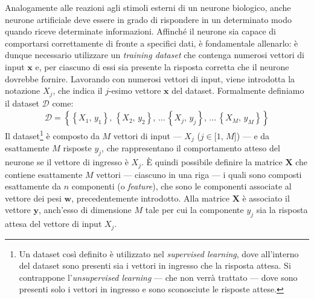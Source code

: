 Analogamente alle reazioni agli stimoli esterni di un neurone biologico, anche neurone artificiale deve essere in grado di rispondere in un determinato modo quando riceve determinate informazioni. Affinché il neurone sia capace di comportarsi correttamente di fronte a specifici dati, è fondamentale allenarlo: è dunque necessario utilizzare un \textit{training dataset} che contenga numerosi vettori di input $\mathbf{x}$ e, per ciascuno di essi sia presente la risposta corretta che il neurone dovrebbe fornire. Lavorando con numerosi vettori di input, viene introdotta la notazione $X_j$, che indica il $j$-esimo vettore $\mathbf{x}$ del dataset. Formalmente definiamo il dataset $\mathcal{D}$ come:
% 
\begin{gather*}
    \mathcal{D} = \left\{ \left\{ X_1,\, y_1 \right\},\,\left\{ X_2,\, y_2 \right\},\,\dots\,\left\{ X_j,\, y_j \right\},\,\dots\,\left\{ X_M,\, y_M \right\} \right\}  
\end{gather*}
% 
\noindent Il dataset\footnote{Un dataset così definito è utilizzato nel \textit{supervised learning}, dove all'interno del dataset sono presenti sia i vettori in ingresso che la risposta attesa. Si contrappone l'\textit{unsupervised learning} — che non verrà trattato — dove sono presenti solo i vettori in ingresso e sono sconosciute le risposte attese.} è composto da $M$ vettori di input — $X_j$ ($j\in[1,\,M$]) — e da esattamente $M$ risposte $y_j$, che rappresentano il comportamento atteso del neurone se il vettore di ingresso è $X_j$. È quindi possibile definire la matrice $\mathbf{X}$ che contiene esattamente $M$ vettori — ciascuno in una riga — i quali sono composti esattamente da $n$ componenti (o \textit{feature}), che sono le componenti associate al vettore dei pesi $\mathbf{w}$, precedentemente introdotto. Alla matrice $\mathbf{X}$ è associato il vettore $\mathbf{y}$, anch'esso di dimensione $M$ tale per cui la componente $y_j$ sia la risposta attesa del vettore di input $X_j$.
% 
